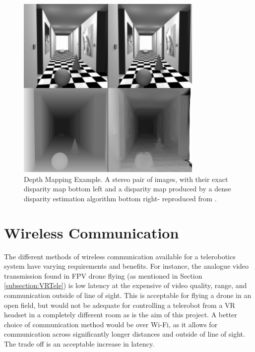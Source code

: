 \begin{figure}[H]
    \begin{center}
      \includegraphics[width=0.8\textwidth]{Figures/depthmap.png}
      \caption[Depth Mapping Example]{Depth Mapping Example. A stereo pair of images, with their exact disparity map bottom left and a disparity map produced by a dense disparity estimation algorithm bottom right- reproduced from \cite{deptheg}.}
      \label{fig:depthmap}
    \end{center}
\end{figure}

\section{Wireless Communication}

The different methods of wireless communication available for a telerobotics system have varying requirements and benefits. For instance, the analogue video transmission found in FPV drone flying (as mentioned in Section \ref{subsection:VRTele}) is low latency at the expensive of video quality, range, and communication outside of line of sight. This is acceptable for flying a drone in an open field, but would not be adequate for controlling a telerobot from a VR headset in a completely different room as is the aim of this project. A better choice of communication method would be over Wi-Fi, as it allows for communication across significantly longer distances and outside of line of sight. The trade off is an acceptable increase in latency.

